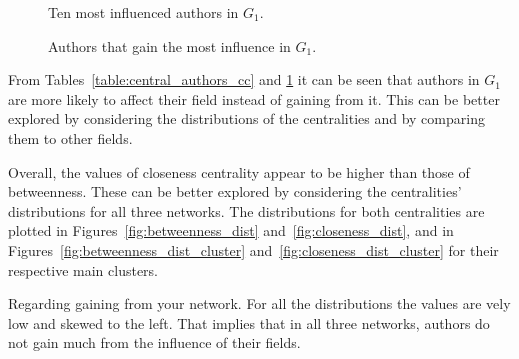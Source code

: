 \documentclass{article}
\theoremstyle{definition}
\begin{document}
\begin{figure}[!hbtp]
    \centering
    \begin{minipage}{.45\textwidth}
        \centering
        
        \caption{Ten most influenced authors in \(G_1\).}\label{table:central_authors_cc}
    \end{minipage}%
    \begin{minipage}{.45\textwidth}
        \centering
        
        \caption{Authors that gain the most influence in \(G_1\).}\label{table:central_authors}
    \end{minipage}
\end{figure}


From Tables~\ref{table:central_authors_cc} and \ref{table:central_authors} it
can be seen that authors in \(G_1\) are more likely to affect their field instead
of gaining from it. This can be better explored by considering the distributions
of the centralities and by comparing them to other fields.

Overall, the values of closeness centrality appear to be higher than those of
betweenness. These can be better explored by considering the centralities'
distributions for all three networks. The distributions for both centralities are
plotted in Figures~\ref{fig:betweenness_dist} and~\ref{fig:closeness_dist}, and
in Figures~\ref{fig:betweenness_dist_cluster} and~\ref{fig:closeness_dist_cluster}
for their respective main clusters.

Regarding gaining from your network. For all the distributions the values
are vely low and skewed to the left. That implies that
in all three networks, authors do not gain much from the influence of their
fields.
\end{document}

